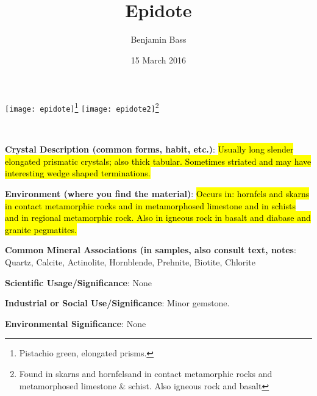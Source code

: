 \documentclass[10pt]{article}
\author{Benjamin Bass}
\date{15 March 2016}
\title{\vspace{-2.0cm} Epidote} %
\begin{document}
\maketitle


\begin{center}
  \texttt{[image: epidote]}\footnote{Pistachio green, elongated prisms.}
  \texttt{[image: epidote2]}\footnote{Found in skarns and hornfelsand in contact metamorphic rocks and metamorphosed limestone \& schist. Also igneous rock and basalt }
\end{center}



\
\
\
\
\
\
\
\
\
\

\begin{framed}
  \textbf{Crystal Description (common forms, habit, etc.)}: \hl{Usually long slender elongated prismatic crystals; also thick tabular. Sometimes striated and may have interesting wedge shaped terminations.}
\end{framed}

\begin{framed}
  \textbf{Environment (where you find the material)}: \hl{Occurs in: hornfels and skarns in contact metamorphic rocks and in metamorphosed limestone and in schists and in regional metamorphic rock. Also in igneous rock in basalt and diabase and granite pegmatites.}
\end{framed}

\begin{framed}
  \textbf{Common Mineral Associations (in samples, also consult text, notes}: Quartz, Calcite, Actinolite, Hornblende, Prehnite, Biotite, Chlorite
\end{framed}

\begin{framed}
  \textbf{Scientific Usage/Significance}: None
\end{framed}

\begin{framed}
  \textbf{Industrial or Social Use/Significance}: Minor gemstone.
\end{framed}

\begin{framed}
  \textbf{Environmental Significance}: None
\end{framed}

\end{document}
